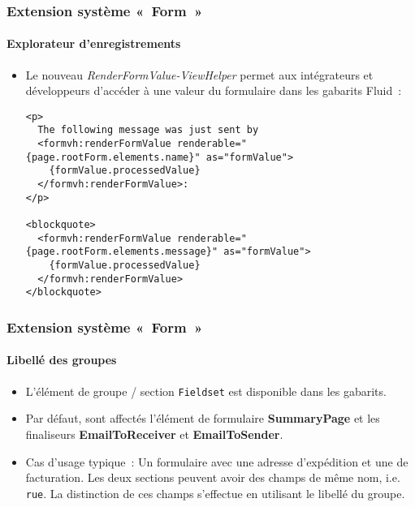 
\begin{frame}[fragile]
	\frametitle{Extension système «~Form~»}
	\framesubtitle{Explorateur d'enregistrements}

	\lstset{basicstyle=\tiny\ttfamily}

	\begin{itemize}
		\item Le nouveau \textit{RenderFormValue-ViewHelper} permet aux intégrateurs et développeurs
			d'accéder à une valeur du formulaire dans les gabarits Fluid~:
\begin{lstlisting}
<p>
  The following message was just sent by
  <formvh:renderFormValue renderable="{page.rootForm.elements.name}" as="formValue">
    {formValue.processedValue}
  </formvh:renderFormValue>:
</p>

<blockquote>
  <formvh:renderFormValue renderable="{page.rootForm.elements.message}" as="formValue">
    {formValue.processedValue}
  </formvh:renderFormValue>
</blockquote>
\end{lstlisting}

	\end{itemize}

\end{frame}


\begin{frame}[fragile]
	\frametitle{Extension système «~Form~»}
	\framesubtitle{Libellé des groupes}

	\begin{itemize}
		\item L'élément de groupe / section \texttt{Fieldset} est disponible dans les gabarits.
		\item Par défaut, sont affectés l'élément de formulaire \textbf{SummaryPage} et les finaliseurs \textbf{EmailToReceiver} et \textbf{EmailToSender}.
		\item Cas d'usage typique~:\newline
			\small
				Un formulaire avec une adresse d'expédition et une de facturation. Les deux sections peuvent avoir des
				champs de même nom, i.e. \texttt{rue}. La distinction de ces champs s'effectue en utilisant le libellé du groupe.
			\normalsize

	\end{itemize}

\end{frame}

